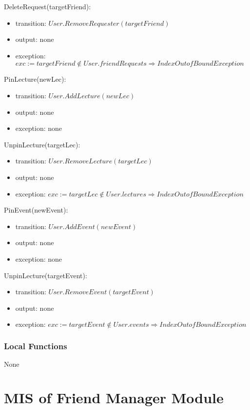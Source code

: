 \documentclass[12pt, titlepage]{article}
\begin{document}
\noindent DeleteRequest(targetFriend):
\begin{itemize}
\item transition: $User.RemoveRequester(targetFriend)$ 
\item output: none
\item exception: $exc := targetFriend \notin User.friendRequests \Rightarrow IndexOutofBound Exception$
\end{itemize}

\noindent PinLecture(newLec):
\begin{itemize}
\item transition: $User.AddLecture(newLec)$ 
\item output: none
\item exception: none
\end{itemize}

\noindent UnpinLecture(targetLec):
\begin{itemize}
\item transition: $User.RemoveLecture(targetLec)$ 
\item output: none
\item exception: $exc := targetLec \notin User.lectures \Rightarrow IndexOutofBound Exception$
\end{itemize}

\noindent PinEvent(newEvent):
\begin{itemize}
\item transition: $User.AddEvent(newEvent)$ 
\item output: none
\item exception: none
\end{itemize}

\noindent UnpinLecture(targetEvent):
\begin{itemize}
\item transition: $User.RemoveEvent(targetEvent)$ 
\item output: none
\item exception: $exc := targetEvent \notin User.events \Rightarrow IndexOutofBound Exception$
\end{itemize}

\subsubsection{Local Functions}

None

\newpage

\section{MIS of Friend Manager Module} \label{mFM}
\end{document}
